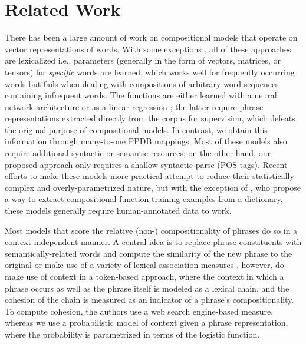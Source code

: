 \documentclass[11pt,letterpaper]{article}
\newcommand{\ensuretext}[1]{#1}
\newcommand{\clabcomment}[3]{\ensuretext{\textcolor{#3}{[#1 #2]}}}
\newcommand{\cjdmarker}{\ensuretext{\textcolor{green}{\ensuremath{^{\textsc{cj}}_{\textsc{d}}}}}}
\newcommand{\cjd}[1]{\clabcomment{\cjdmarker}{#1}{green}}
\begin{document}
\section{Related Work}

There has been a large amount of work on compositional models that operate on vector representations of words. 
With some exceptions \cite{Mitchell2008,Mitchell2010}, all of these approaches are lexicalized i.e., parameters (generally in the form of vectors, matrices, or tensors) for \emph{specific} words are learned, which works well for frequently occurring words but fails when dealing with compositions of arbitrary word sequences containing infrequent words. 
The functions are either learned with a neural network architecture \cite[\emph{inter alia}]{Socher2013} or as a linear regression \cite{Baroni2010}; the latter require phrase representations extracted directly from the corpus for supervision, which defeats the original purpose of compositional models. 
In contrast, we obtain this information through many-to-one PPDB mappings. 
Most of these models also require additional syntactic \cite{Socher2012} or semantic \cite{Hermann2013,Grefenstette2013} resources; on the other hand, our proposed approach only requires a shallow syntactic parse (POS tags).  
Recent efforts to make these models more practical \cite{Paperno2014} attempt to reduce their statistically complex and overly-parametrized nature, but with the exception of , who propose a way to extract compositional function training examples from a dictionary, these models generally require human-annotated data to work.  

Most models that score the relative (non-) compositionality of phrases do so in a context-independent manner. 
A central idea is to replace phrase constituents with semantically-related words and compute the similarity of the new phrase to the original \cite{Kiela2013,Salehi2014} or make use of a variety of lexical association measures \cite{Lin1999,Pecina2006}. 
 however, do make use of context in a token-based approach, where the context in which a phrase occurs as well as the phrase itself is modeled as a lexical chain, and the cohesion of the chain is measured as an indicator of a phrase's compositionality. 
To compute cohesion, the authors use a web search engine-based measure, whereas we use a probabilistic model of context given a phrase representation, where the probability is parametrized in terms of the logistic function.  
\end{document}
